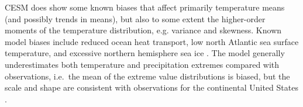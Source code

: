 \documentclass{ametsoc}
\begin{document}

CESM does show some known biases that affect primarily temperature means (and possibly trends in means), 
but also to some extent the higher-order moments of the temperature distribution, e.g. variance and skewness. Known model biases include reduced ocean heat transport, low north Atlantic sea surface temperature, and excessive northern hemisphere sea ice \citep{shields2012low}. %
The model generally underestimates both temperature and precipitation extremes compared with observations, i.e.\ the mean of the extreme value distributions is biased, but the scale and shape are consistent with observations for the continental United States \citep{sriver2015effects}. 
\end{document}
